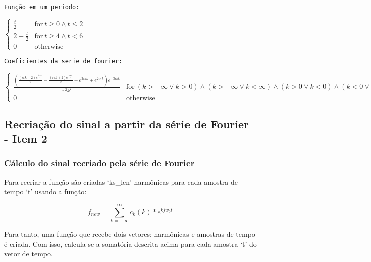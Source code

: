 \documentclass[11pt]{article}
\begin{document}
    \begin{Verbatim}[commandchars=\\\{\}]
Função em um periodo:
    \end{Verbatim}

    $\displaystyle \begin{cases} \frac{t}{2} & \text{for}\: t \geq 0 \wedge t \leq 2 \\2 - \frac{t}{2} & \text{for}\: t \geq 4 \wedge t < 6 \\0 & \text{otherwise} \end{cases}$

    
    \begin{Verbatim}[commandchars=\\\{\}]
Coeficientes da serie de fourier:
    \end{Verbatim}

    $\displaystyle \begin{cases} \frac{\left(\frac{\left(i \pi k + 2\right) e^{\frac{5 i \pi k}{2}}}{2} - \frac{\left(i \pi k + 2\right) e^{\frac{3 i \pi k}{2}}}{2} - e^{3 i \pi k} + e^{2 i \pi k}\right) e^{- 3 i \pi k}}{\pi^{2} k^{2}} & \text{for}\: \left(k > -\infty \vee k > 0\right) \wedge \left(k > -\infty \vee k < \infty\right) \wedge \left(k > 0 \vee k < 0\right) \wedge \left(k < 0 \vee k < \infty\right) \\0 & \text{otherwise} \end{cases}$

    
    \hypertarget{recriauxe7uxe3o-do-sinal-a-partir-da-suxe9rie-de-fourier---item-2}{%
\subsection{Recriação do sinal a partir da série de Fourier - Item
2}\label{recriauxe7uxe3o-do-sinal-a-partir-da-suxe9rie-de-fourier---item-2}}

    \hypertarget{cuxe1lculo-do-sinal-recriado-pela-suxe9rie-de-fourier}{%
\subsubsection{Cálculo do sinal recriado pela série de
Fourier}\label{cuxe1lculo-do-sinal-recriado-pela-suxe9rie-de-fourier}}

Para recriar a função são criadas `ks\_len' harmônicas para cada amostra
de tempo `t' usando a função:

\[ 
f_{new} =
\sum_{k = -\infty}^{\infty}
c_k(k) * e^{k j w_0 t}
\]

Para tanto, uma função que recebe dois vetores: harmônicas e amostras de
tempo é criada. Com isso, calcula-se a somatória descrita acima para
cada amostra `t' do vetor de tempo.
\end{document}
